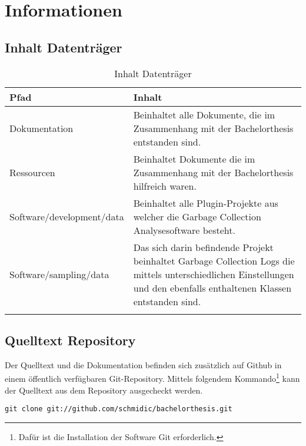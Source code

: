 \chapter{Informationen}

\section{Inhalt Datenträger}
  \begin{longtable}{|p{5cm}|p{8cm}|}
\hline
  \textbf{Pfad} & \textbf{Inhalt}\\\hline
    Dokumentation & Beinhaltet alle Dokumente, die im Zusammenhang mit der Bachelorthesis entstanden sind.\\\hline
    Ressourcen & Beinhaltet Dokumente die im Zusammenhang mit der Bachelorthesis hilfreich waren.\\\hline
    Software/development/data & Beinhaltet alle Plugin-Projekte aus welcher die Garbage Collection Analysesoftware besteht.\\\hline
    Software/sampling/data & Das sich darin befindende Projekt beinhaltet Garbage Collection Logs die mittels unterschiedlichen Einstellungen und den ebenfalls enthaltenen Klassen entstanden sind. \\\hline
      \caption{Inhalt Datenträger}\\
  \end{longtable}

\section{Quelltext Repository}
Der Quelltext und die Dokumentation befinden sich zusätzlich auf Github in einem öffentlich verfügbaren Git-Repository. Mittels folgendem Kommando\footnote{Dafür ist die Installation der Software Git erforderlich.} kann der Quelltext aus dem Repository ausgecheckt werden.

\begin{lstlisting}[caption=Checkout Quelltext Repository]
git clone git://github.com/schmidic/bachelorthesis.git
\end{lstlisting}



